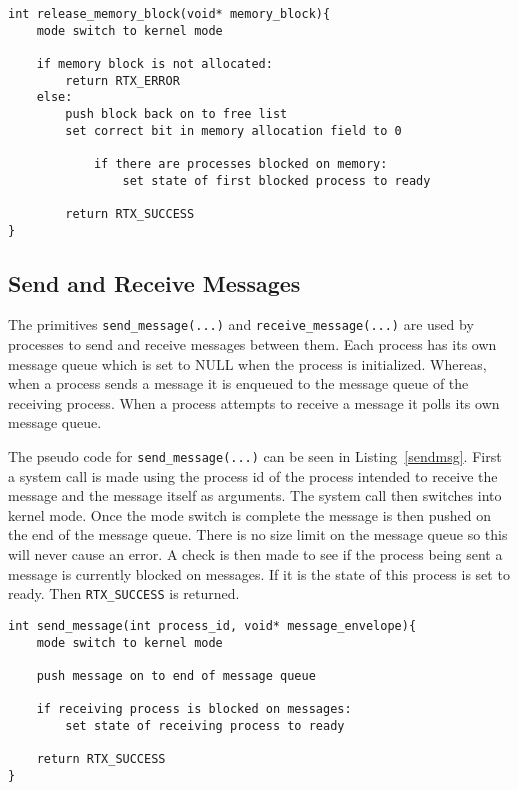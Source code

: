 \documentclass[oneside]{article}
\begin{document}
\begin{lstlisting}
int release_memory_block(void* memory_block){
    mode switch to kernel mode

    if memory block is not allocated:
        return RTX_ERROR
    else:
        push block back on to free list
        set correct bit in memory allocation field to 0

            if there are processes blocked on memory:
                set state of first blocked process to ready

        return RTX_SUCCESS        
}
\end{lstlisting}

\subsection*{Send and Receive Messages}

The primitives \texttt{send\_message(...)} and \texttt{receive\_message(...)} are used by processes 
to send and receive messages between them. Each process has its own message queue which is set to NULL 
when the process is initialized. Whereas, when a process sends a message it is enqueued to the message queue of 
the receiving process. When a process attempts to receive a message it polls its own message queue.

The pseudo code for \texttt{send\_message(...)} can be seen in Listing~\ref{sendmsg}. First a system call 
is made using the process id of the process intended to receive the message and the message itself as 
arguments. The system call then switches into kernel mode. Once the mode switch is complete the message is 
then pushed on the end of the message queue. There is no size limit on the message queue so this will never 
cause an error. A check is then made to see if the process being sent a message is currently blocked on 
messages. If it is the state of this process is set to ready. Then \texttt{RTX\_SUCCESS} is returned.


\begin{lstlisting}
int send_message(int process_id, void* message_envelope){
    mode switch to kernel mode

    push message on to end of message queue

    if receiving process is blocked on messages:
        set state of receiving process to ready

    return RTX_SUCCESS
}
\end{lstlisting}
\end{document}
